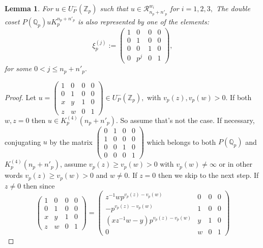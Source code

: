 \documentclass[11pt]{amsart}
\newtheorem{lemma}{Lemma}[section]
\newcommand{\Z}{\mathbb Z}
\newcommand{\mirp}[1]{K_p^{(4)}(#1)}
\begin{document}
\begin{lemma}
For $u \in U_P^{-}(\mathbb{Z}_p)$ such that $u \in \mathcal{R}_{n_p + n'_p}^{w_i}$ for $i=1,2,3,$ 
The double coset $P(\mathbb{Q}_p) u K_p^{n_p + n'_p}$ is also represented by one of the elements: 
\[ 
\xi_p^{(j)}:=\left(\begin{smallmatrix} 1 & 0 & 0 & 0 \\ 0 & 1 & 0 & 0\\ 0 & 0 & 1 & 0 \\ 0 & p^j & 0 & 1\end{smallmatrix}\right) , 
\]
for some $0 < j \leq n_p + n'_p.$ 
\end{lemma}
\begin{proof}
Let
$%
u = \left(\begin{smallmatrix}
			1 & 0 & 0 & 0 \\
			0 & 1 & 0 & 0 \\
			x & y & 1 & 0 \\
			z & w & 0 & 1
		\end{smallmatrix}\right) \in U_P^{-}(\Z_p),$ 
with $v_p(z), v_p(w) > 0.$ If both $w, z = 0$ then $u \in \mirp{n_p + n'_p}$. So assume that's not the case. 
If necessary, conjugating $u$ by the matrix
$\left(\begin{smallmatrix}
		0 & 1 & 0 & 0 \\
		1 & 0 & 0 & 0 \\
		0 & 0 & 1 & 0 \\
		0 & 0 & 0 & 1
	\end{smallmatrix}\right)$
which belongs to both $P(\mathbb{Q}_p)$ and $\mirp{n_p + n'_p}$, assume
$v_p(z) \geq v_p(w) > 0$ with $v_p(w) \neq  \infty$ or in other words $v_p(z) \geq v_p(w) > 0$ and $w \neq 0.$
If $z = 0$ then we skip to the next step. If $z \neq 0$ then since
$$
\left(\begin{smallmatrix}
			1 & 0 & 0 & 0 \\
			0 & 1 & 0 & 0 \\
			x & y & 1 & 0 \\
			z & w & 0 & 1
		\end{smallmatrix}\right) 
= 
		\left(\begin{smallmatrix}
			z^{-1}w p^{v_p(z) - v_p(w)} & 0 & 0 & 0 \\
			- p^{v_p(z) - v_p(w)} & 1 & 0 & 0 \\
			(x z^{-1}w - y) p^{v_p(z) - v_p(w)} & y & 1 & 0 \\
			0 & w & 0 & 1
		\end{smallmatrix}\right) 
$$
\end{proof}
\end{document}

